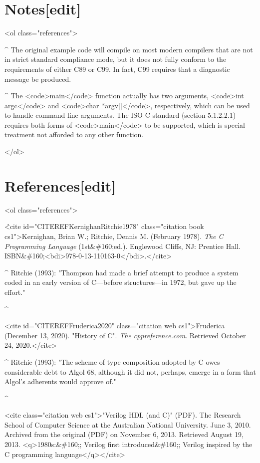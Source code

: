 \documentclass{article}\usepackage{titlesec}
\begin{document}
\section{Notes[edit]}

<ol class="references">
\item\textbf{\^} The original example code will compile on most modern compilers that are not in strict standard compliance mode, but it does not fully conform to the requirements of either C89 or C99. In fact, C99 requires that a diagnostic message be produced.

\item\textbf{\^} The <code>main</code> function actually has two arguments, <code>int argc</code> and <code>char *argv[]</code>, respectively, which can be used to handle command line arguments.  The ISO C standard (section 5.1.2.2.1) requires both forms of <code>main</code> to be supported, which is special treatment not afforded to any other function.

</ol>
\section{References[edit]}
\item<ol class="references">
\item\^   <cite id="CITEREFKernighanRitchie1978" class="citation book cs1">Kernighan, Brian W.; Ritchie, Dennis M. (February 1978). \emph{The C Programming Language} (1st&\#160;ed.). Englewood Cliffs, NJ: Prentice Hall. ISBN&\#160;<bdi>978-0-13-110163-0</bdi>.</cite>

\item\textbf{\^} Ritchie (1993): "Thompson had made a brief attempt to produce a system coded in an early version of C—before structures—in 1972, but gave up the effort."

\item\textbf{\^} \item<cite id="CITEREFFruderica2020" class="citation web cs1">Fruderica (December 13, 2020). "History of C". \emph{The cppreference.com}. Retrieved October 24, 2020.</cite>

\item\textbf{\^} Ritchie (1993): "The scheme of type composition adopted by C owes considerable debt to Algol 68, although it did not, perhaps, emerge in a form that Algol's adherents would approve of."

\item\^   \item<cite class="citation web cs1">"Verilog HDL (and C)" (PDF). The Research School of Computer Science at the Australian National University. June 3, 2010. Archived from the original (PDF) on November 6, 2013. Retrieved August 19, 2013. <q>1980s:&\#160;; Verilog first introduced&\#160;; Verilog inspired by the C programming language</q></cite>
\end{document}

